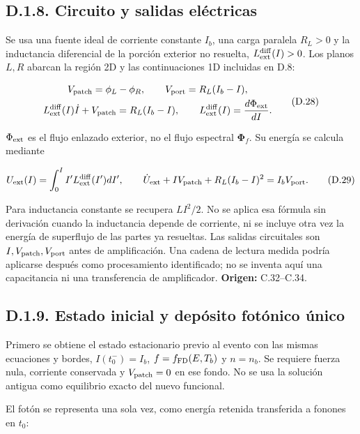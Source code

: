 \documentclass[
  spanish,
  10pt,
  a4paper,
]{article}
\newcounter{none} %
\begin{document}
\subsection{D.1.8. Circuito y salidas
eléctricas}\label{d.1.8.-circuito-y-salidas-eluxe9ctricas}

Se usa una fuente ideal de corriente constante \(I_b\), una carga
paralela \(R_L>0\) y la inductancia diferencial de la porción exterior
no resuelta, \(L_{\rm ext}^{\rm diff}(I)>0\). Los planos \(L,R\) abarcan
la región 2D y las continuaciones 1D incluidas en D.8:

\[
\begin{gathered}
V_{\rm patch}=\phi_L-\phi_R,\qquad
V_{\rm port}=R_L(I_b-I),\\
L_{\rm ext}^{\rm diff}(I)\dot I+V_{\rm patch}=R_L(I_b-I),\qquad
L_{\rm ext}^{\rm diff}(I)=\frac{d\Phi_{\rm ext}}{dI}.
\end{gathered}\tag{D.28}
\]

\(\Phi_{\rm ext}\) es el flujo enlazado exterior, no el flujo espectral
\(\boldsymbol\Phi_f\). Su energía se calcula mediante

\[
U_{\rm ext}(I)=\int_0^I I' L_{\rm ext}^{\rm diff}(I')dI',\qquad
\dot U_{\rm ext}+I V_{\rm patch}+R_L(I_b-I)^2=I_bV_{\rm port}.
\tag{D.29}
\]

Para inductancia constante se recupera \(LI^2/2\). No se aplica esa
fórmula sin derivación cuando la inductancia depende de corriente, ni se
incluye otra vez la energía de superflujo de las partes ya resueltas.
Las salidas circuitales son \(I,V_{\rm patch},V_{\rm port}\) antes de
amplificación. Una cadena de lectura medida podría aplicarse después
como procesamiento identificado; no se inventa aquí una capacitancia ni
una transferencia de amplificador. \textbf{Origen:} C.32--C.34.

\subsection{D.1.9. Estado inicial y depósito fotónico
único}\label{d.1.9.-estado-inicial-y-depuxf3sito-fotuxf3nico-uxfanico}

Primero se obtiene el estado estacionario previo al evento con las
mismas ecuaciones y bordes, \(I(t_0^-)=I_b\), \(f=f_{\rm FD}(E,T_b)\) y
\(n=n_b\). Se requiere fuerza nula, corriente conservada y
\(V_{\rm patch}=0\) en ese fondo. No se usa la solución antigua como
equilibrio exacto del nuevo funcional.

El fotón se representa una sola vez, como energía retenida transferida a
fonones en \(t_0\):
\end{document}
